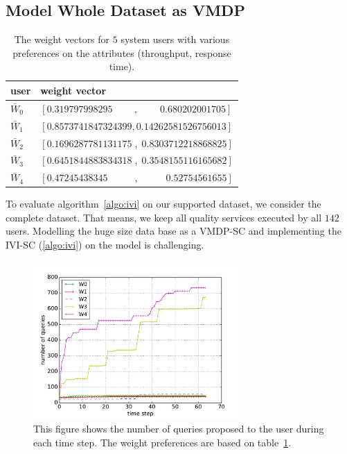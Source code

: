 \documentclass[10pt,journal,compsoc]{IEEEtran}
\begin{document}

\subsection{Model Whole Dataset as VMDP}

\begin{table}
\begin{tabular}{ l | l | }
  user & weight vector \\
  \toprule
   $\bar{W}_0$ & $[0.319797998295 \;\;\;\;\;\;\;\;, \;\;\;\;\;\;\;\; 0.680202001705]$ \\
   $\bar{W}_1$ & $[0.8573741847324399 , 0.14262581526756013]$ \\
   $\bar{W}_2$ & $[0.1696287781131175\;,\; 0.8303712218868825]$ \\
   $\bar{W}_3$ & $[0.6451844883834318\;,\; 0.3548155116165682]$\\
   $\bar{W}_4$ & $[0.47245438345\;\;\;\;\;\;\;\;\;\; , \;\;\;\;\;\;\;\;\;\; 0.52754561655]$\\ 
 \end{tabular} 
 \caption{The weight vectors for $5$ system users with various preferences on the attributes (throughput, response time).} 
 \label{table:weights}
\end{table}

To evaluate algorithm~\ref{algo:ivi} on our supported dataset, we consider the complete dataset. That means, we keep all quality services executed by all $142$ users. Modelling the huge size data base as a VMDP-SC and implementing the IVI-SC (\ref{algo:ivi}) on the model is challenging.  

\begin{figure}[t]
\includegraphics[width=8cm]{new_graphs/time-queries-all++.pdf}
\caption{This figure shows the number of queries proposed to the user during each time step. The weight preferences are based on table~\ref{table:weights}.}
\centering
\label{fig:queries-vs-timestep}
\end{figure}
\end{document}
